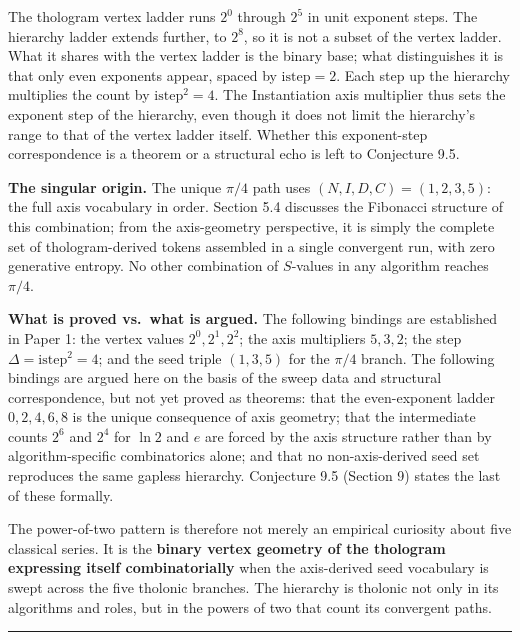 \documentclass[
  11pt,
  letterpaper,
]{article}
\begin{document}
The thologram vertex ladder runs \(2^0\) through \(2^5\) in unit
exponent steps. The hierarchy ladder extends further, to \(2^8\), so it
is not a subset of the vertex ladder. What it shares with the vertex
ladder is the binary base; what distinguishes it is that only even
exponents appear, spaced by \(\mathrm{istep} = 2\). Each step up the
hierarchy multiplies the count by \(\mathrm{istep}^2 = 4\). The
Instantiation axis multiplier thus sets the exponent step of the
hierarchy, even though it does not limit the hierarchy's range to that
of the vertex ladder itself. Whether this exponent-step correspondence
is a theorem or a structural echo is left to Conjecture 9.5.

\textbf{The singular origin.} The unique \(\pi/4\) path uses
\((N, I, D, C) = (1, 2, 3, 5)\): the full axis vocabulary in order.
Section 5.4 discusses the Fibonacci structure of this combination; from
the axis-geometry perspective, it is simply the complete set of
thologram-derived tokens assembled in a single convergent run, with zero
generative entropy. No other combination of \(S\)-values in any
algorithm reaches \(\pi/4\).

\textbf{What is proved vs.~what is argued.} The following bindings are
established in Paper 1: the vertex values \(2^0, 2^1, 2^2\); the axis
multipliers \(5, 3, 2\); the step \(\Delta = \mathrm{istep}^2 = 4\); and
the seed triple \((1, 3, 5)\) for the \(\pi/4\) branch. The following
bindings are argued here on the basis of the sweep data and structural
correspondence, but not yet proved as theorems: that the even-exponent
ladder \(0, 2, 4, 6, 8\) is the unique consequence of axis geometry;
that the intermediate counts \(2^6\) and \(2^4\) for \(\ln 2\) and \(e\)
are forced by the axis structure rather than by algorithm-specific
combinatorics alone; and that no non-axis-derived seed set reproduces
the same gapless hierarchy. Conjecture 9.5 (Section 9) states the last
of these formally.

The power-of-two pattern is therefore not merely an empirical curiosity
about five classical series. It is the \textbf{binary vertex geometry of
the thologram expressing itself combinatorially} when the axis-derived
seed vocabulary is swept across the five tholonic branches. The
hierarchy is tholonic not only in its algorithms and roles, but in the
powers of two that count its convergent paths.

\begin{center}\rule{0.5\linewidth}{0.5pt}\end{center}
\end{document}
